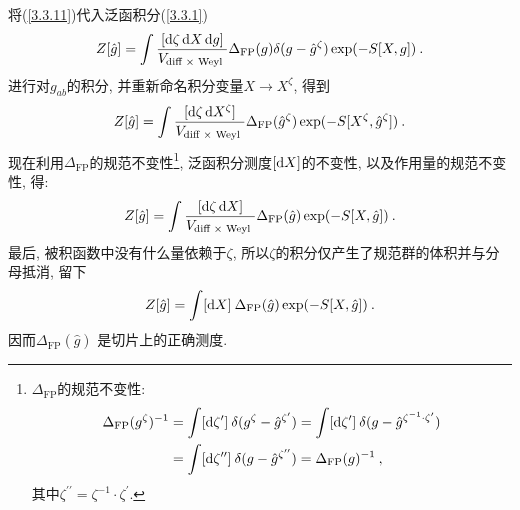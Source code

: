 将(\ref{3.3.11})代入泛函积分(\ref{3.3.1})
\begin{equation}
Z[\hat{g}]=\int \frac{[\mathrm{d} \zeta \,\mathrm{d} X \,\mathrm{d} g]}{V_{\text {diff } \times \text { Weyl }}}  \Delta_{\mathrm{FP}}(g) \delta(g-\hat{g}^{\zeta}) \exp (-S[X, g]) \:. \label{3.3.12}
\end{equation}
进行对$g_{ab}$的积分, 并重新命名积分变量$X \to X^{\zeta}$, 得到
\begin{equation}
Z[\hat{g}]=\int \frac{[\mathrm{d} \zeta\, \mathrm{d} X^{\zeta}]}{V_{\text {diff } \times \text { Weyl }}} \Delta_{\mathrm{FP}}(\hat{g}^{\zeta}) \exp (-S[X^{\zeta}, \hat{g}^{\zeta}]) \:. \label{3.3.13}
\end{equation}
现在利用$\Delta_{\mathrm{FP}}$的规范不变性\footnote{$\Delta_{\mathrm{FP}}$的规范不变性: 
\begin{align*}
\Delta_{\mathrm{FP}}(g^{\zeta})^{-1} &=\int[\mathrm{d} \zeta^{\prime}] \: \delta(g^{\zeta}-\hat{g}^{\zeta^{\prime}})
=\int[\mathrm{d} \zeta^{\prime}]\: \delta(g-\hat{g}^{\zeta^{-1} \cdot \zeta^{\prime}}) \\
&=\int[\mathrm{d} \zeta^{\prime \prime}] \: \delta(g-\hat{g}^{\zeta^{\prime \prime}})=\Delta_{\mathrm{FP}}(g)^{-1} \:,
\end{align*}
其中$\zeta^{\prime \prime}=\zeta^{-1} \cdot \zeta^{\prime} $.}, 泛函积分测度$[\mathrm{d} X]$的不变性, 以及作用量的规范不变性, 得: 
\begin{equation}
Z[\hat{g}]=\int \frac{[\mathrm{d} \zeta\, \mathrm{d} X]}{V_{\text {diff } \times \text { Weyl }}} \Delta_{\mathrm{FP}}(\hat{g}) \exp (-S[X, \hat{g}]) \:. \label{3.3.14}
\end{equation}
最后, 被积函数中没有什么量依赖于$\zeta$, 所以$\zeta$的积分仅产生了规范群的体积并与分母抵消, 留下
\begin{equation}
Z[\hat{g}]=\int[\mathrm{d} X] \: \Delta_{\mathrm{FP}}(\hat{g}) \exp (-S[X, \hat{g}]) \:. \label{3.3.15}
\end{equation}
因而$\Delta_{\mathrm{FP}}(\hat{g})$ 是切片上的正确测度.

